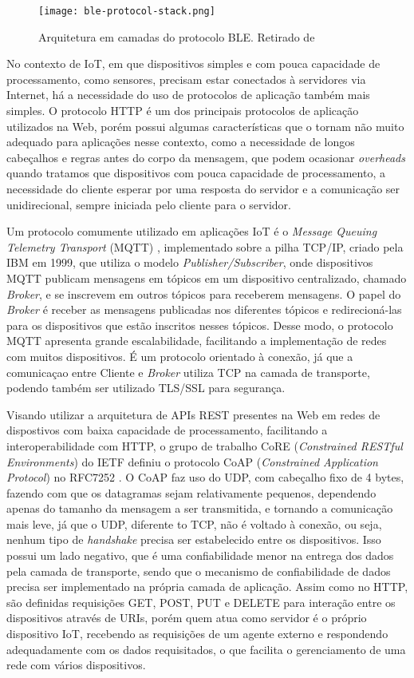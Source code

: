 \documentclass[../monografia.tex]{subfiles}
\begin{document}
\begin{figure}[h]
\centering
\texttt{[image: ble-protocol-stack.png]}
\caption{Arquitetura em camadas do protocolo BLE. Retirado de \cite{ble-protocol-stack}}
\label{fig:ble-stack}
\end{figure}

No contexto de IoT, em que dispositivos simples e com pouca capacidade de processamento, como sensores, precisam estar conectados à servidores via Internet, há a necessidade do uso  de protocolos de aplicação também mais simples. O protocolo HTTP é um dos principais protocolos de aplicação utilizados na Web, porém possui algumas características que o tornam não muito adequado para aplicações nesse contexto, como a necessidade de longos cabeçalhos e regras antes do corpo da mensagem, que podem ocasionar \textit{overheads} quando tratamos que dispositivos com pouca capacidade de processamento, a necessidade do cliente esperar por uma resposta do servidor e a comunicação ser unidirecional, sempre iniciada pelo cliente para o servidor.

Um protocolo comumente utilizado em aplicações IoT é o \textit{Message Queuing Telemetry Transport} (MQTT) \cite{mqtt-specification}, implementado sobre a pilha TCP/IP, criado pela IBM em 1999, que utiliza o modelo \textit{Publisher/Subscriber}, onde dispositivos MQTT publicam mensagens em tópicos em um dispositivo centralizado, chamado \textit{Broker}, e se inscrevem em outros tópicos para receberem mensagens. O papel do \textit{Broker} é receber as mensagens publicadas nos diferentes tópicos e redirecioná-las para os dispositivos que estão inscritos nesses tópicos. Desse modo, o protocolo MQTT apresenta grande escalabilidade, facilitando a implementação de redes com muitos dispositivos. É um protocolo orientado à conexão, já que a comunicaçao entre Cliente e \textit{Broker} utiliza TCP na camada de transporte, podendo também ser utilizado TLS/SSL para segurança. 

Visando utilizar a arquitetura de APIs REST presentes na Web em redes de dispostivos com baixa capacidade de processamento, facilitando a interoperabilidade com HTTP, o grupo de trabalho CoRE (\textit{Constrained RESTful Environments}) do IETF definiu o protocolo CoAP (\textit{Constrained Application Protocol}) no RFC7252 \cite{coap-specification}. O CoAP faz uso do UDP, com cabeçalho fixo de 4 bytes, fazendo com que os datagramas sejam relativamente pequenos, dependendo apenas do tamanho da mensagem a ser transmitida, e tornando a comunicação mais leve, já que o UDP, diferente to TCP, não é voltado à conexão, ou seja, nenhum tipo de \textit{handshake} precisa ser estabelecido entre os dispositivos. Isso possui um lado negativo, que é uma confiabilidade menor na entrega dos dados pela camada de transporte, sendo que o mecanismo de confiabilidade de dados precisa ser implementado na própria camada de aplicação. Assim como no HTTP, são definidas requisições GET, POST, PUT e DELETE para interação entre os dispositivos através de URIs, porém quem atua como servidor é o próprio dispositivo IoT, recebendo as requisições de um agente externo e respondendo adequadamente com os dados requisitados, o que facilita o gerenciamento de uma rede com vários dispositivos. 
\end{document}
